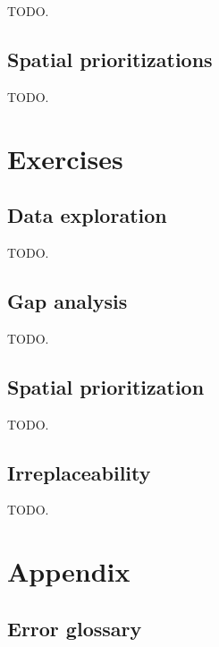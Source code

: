 \documentclass[]{book}
\begin{document}
TODO.

\chapter{Spatial prioritizations}\label{spatial-prioritizations}

TODO.

\part{Exercises}\label{part-exercises}

\chapter{Data exploration}\label{data-exploration}

TODO.

\chapter{Gap analysis}\label{gap-analysis}

TODO.

\chapter{Spatial prioritization}\label{spatial-prioritization}

TODO.

\chapter{Irreplaceability}\label{irreplaceability}

TODO.

\part{Appendix}\label{part-appendix}

\chapter{Error glossary}\label{error-glossary}
\end{document}
